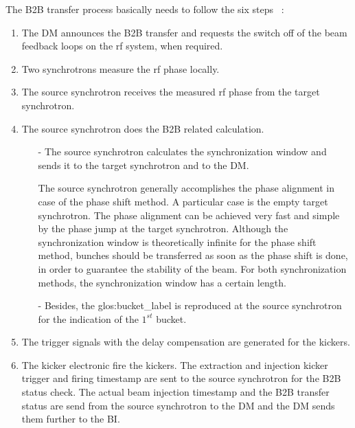 The B2B transfer process basically needs to follow the six steps ~\cite{bai_bunch_2015}:
\begin{enumerate}
\item The DM announces the B2B transfer and requests the switch off of the beam feedback loops on the rf system, when required.
\item Two synchrotrons measure the rf phase locally.
\item The source synchrotron receives the measured rf phase from the target synchrotron.
\item The source synchrotron does the B2B related calculation.
\begin{enumerate}
\item[-] The source synchrotron calculates the synchronization window and sends it to the target synchrotron and to the DM. 

The source synchrotron generally accomplishes the phase alignment in case of the phase shift method. A particular case is the empty target synchrotron. The phase alignment can be achieved very fast and simple by the phase jump at the target synchrotron. Although the synchronization window is theoretically infinite for the phase shift method, bunches should be transferred as soon as the phase shift is done, in order to guarantee the stability of the beam. For both synchronization methods, the synchronization window has a certain length.

\item[-] Besides, the \gls{glos:bucket_label} is reproduced at the source synchrotron for the indication of the $1^\mathit{st}$ bucket.
\end{enumerate}
\item The trigger signals with the delay compensation are generated for the kickers.
\item The kicker electronic fire the kickers. The extraction and injection kicker trigger and firing timestamp are sent to the source synchrotron for the B2B status check. The actual beam injection timestamp and the B2B transfer status are send from the source synchrotron to the DM and the DM sends them further to the BI.

\end{enumerate}



